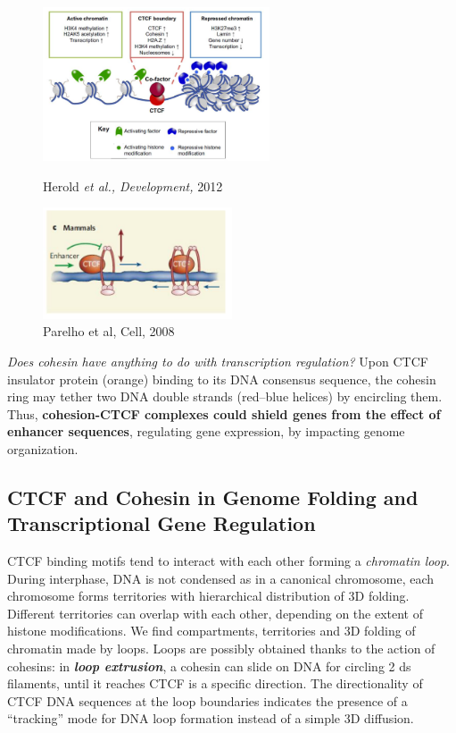 \begin{figure}[!htb]
   \begin{minipage}{0.48\textwidth}
     \centering
     \includegraphics[width=0.6\textwidth]{../_resources/Screenshot_2022-10-14_at_12-11-11.png}
\caption{Herold \emph{et al., Development,} 2012}
\label{fig:chrom}
   \end{minipage}\hfill
   \begin{minipage}{0.48\textwidth}
     \centering
     \includegraphics[width=0.5\textwidth]{../_resources/Screenshot_2022-10-14_at_12-10-46.png}
\caption{Parelho et al, Cell, 2008}
\label{fig:cohe}
   \end{minipage}
\end{figure}

\emph{Does cohesin have anything to do with transcription regulation?}
Upon CTCF insulator protein (orange) binding to its DNA consensus sequence, the cohesin ring may tether two DNA double strands (red--blue helices) by encircling them. Thus, \textbf{cohesion-CTCF complexes could shield genes from the effect of enhancer sequences}, regulating gene expression, by impacting genome organization.

\subsection{CTCF and Cohesin in Genome Folding and Transcriptional Gene Regulation}

CTCF binding motifs tend to interact with each other forming a \emph{chromatin loop}. During interphase, DNA is not condensed as in a canonical chromosome, each chromosome forms territories with hierarchical distribution of 3D folding. Different territories can overlap with each other, depending on the extent of histone modifications. We find compartments, territories and 3D folding of chromatin made by loops. Loops are possibly obtained thanks to the action of cohesins: in \textbf{\emph{loop extrusion}}, a cohesin can slide on DNA for circling 2 ds filaments, until it reaches CTCF is a specific direction. The directionality of CTCF DNA sequences at the loop boundaries indicates the presence of a ``tracking'' mode for DNA loop formation instead of a simple 3D diffusion.

